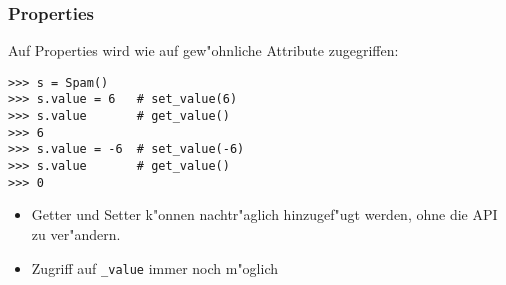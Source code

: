 \begin{frame}[fragile]
\frametitle{Properties}
Auf Properties wird wie auf gew"ohnliche Attribute zugegriffen:
\begin{lstlisting}[style=Shell]
>>> s = Spam()
>>> s.value = 6   # set_value(6)
>>> s.value       # get_value()
>>> 6
>>> s.value = -6  # set_value(-6)
>>> s.value       # get_value()
>>> 0
\end{lstlisting}
\begin{itemize}
\item Getter und Setter k"onnen nachtr"aglich hinzugef"ugt werden, ohne die API zu ver"andern.
\item Zugriff auf \lstinline{_value} immer noch m"oglich
\end{itemize}

\end{frame}


